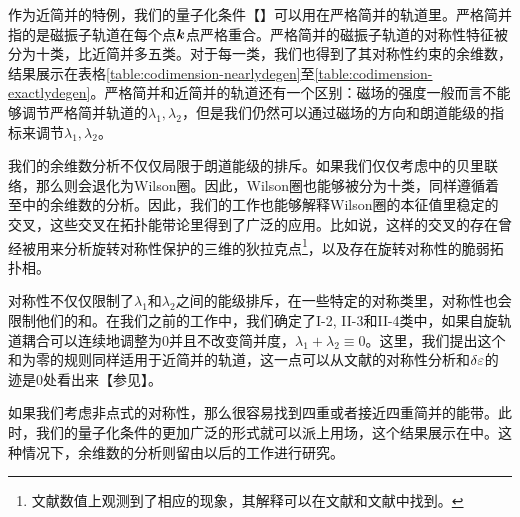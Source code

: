 作为近简并的特例，我们的量子化条件【】可以用在严格简并的轨道里。严格简并指的是磁振子轨道在每个点$\boldsymbol{k}$点严格重合。严格简并的磁振子轨道的对称性特征被分为十类，比近简并多五类。对于每一类，我们也得到了其对称性约束的余维数，结果展示在表格\ref{table:codimension-nearlydegen}至\ref{table:codimension-exactlydegen}。严格简并和近简并的轨道还有一个区别：磁场的强度一般而言不能够调节严格简并轨道的$\lambda_1,\lambda_2$，但是我们仍然可以通过磁场的方向和朗道能级的指标来调节$\lambda_1,\lambda_2$。


我们的余维数分析不仅仅局限于朗道能级的排斥。如果我们仅仅考虑中的贝里联络，那么则会退化为Wilson圈\cite{wilczek_appearance_1984}。因此，Wilson圈也能够被分为十类，同样遵循着至中的余维数的分析。因此，我们的工作也能够解释Wilson圈的本征值里稳定的交叉，这些交叉在拓扑能带论里得到了广泛的应用。比如说，这样的交叉的存在曾经被用来分析旋转对称性保护的三维的狄拉克点\footnote{文献数值上观测到了相应的现象，其解释可以在文献和文献中找到。}，以及存在旋转对称性的脆弱拓扑相\cite{bouhon_wilson_2018,bradlyn_disconnected_2018}。


对称性不仅仅限制了$\lambda_1$和$\lambda_2$之间的能级排斥，在一些特定的对称类里，对称性也会限制他们的和。在我们之前的工作中\cite{100p,topoferm}，我们确定了I-2, II-3和II-4类中，如果自旋轨道耦合可以连续地调整为0并且不改变简并度，$\lambda_1{+}\lambda_2{\equiv}0$。这里，我们提出这个和为零的规则同样适用于近简并的轨道，这一点可以从文献的对称性分析和$\delta\varepsilon$的迹是0处看出来【参见】。

如果我们考虑非点式的对称性，那么很容易找到四重或者接近四重简并的能带\cite{michel_elementary_2001,wang_hourglass_2016,bradlyn_topological_2017}。此时，我们的量子化条件的更加广泛的形式就可以派上用场，这个结果展示在中。这种情况下，余维数的分析则留由以后的工作进行研究。
